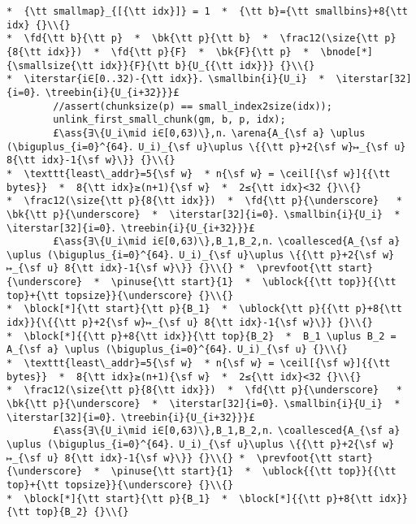 \documentclass[10pt,a4paper,twoside]{report}
\makeatletter
\newcommand{\ml}[2][t]{\mbox{\mdseries\begin{tabular}[#1]{@{}L@{}}#2\end{tabular}}}
\newcommand{\ass}[1]{\ensuremath{{\color{blue}\left\{\ml[c]{#1}\right\}}}}
\renewcommand{\ceil}[2][]{\left\lceil{#2}\right\rceil_{#1}}
\newcommand{\iterstar}[2][]{\text{\LARGE $*$}^{#1}_{#2}}
\makeatother
\begin{document}
\begin{lstlisting}
*  {\tt smallmap}_{[{\tt idx}]} = 1  *  {\tt b}={\tt smallbins}+8{\tt idx} {}\\{}
*  \fd{\tt b}{\tt p}  *  \bk{\tt p}{\tt b}  *  \frac12(\size{\tt p}{8{\tt idx}})  *  \fd{\tt p}{F}  *  \bk{F}{\tt p}  *  \bnode[*]{\smallsize{\tt idx}}{F}{\tt b}{U_{{\tt idx}}} {}\\{}
*  \iterstar{i∈[0..32)-{\tt idx}}．\smallbin{i}{U_i}  *  \iterstar[32]{i=0}．\treebin{i}{U_{i+32}}}£ 
        //assert(chunksize(p) == small_index2size(idx));
        unlink_first_small_chunk(gm, b, p, idx);
        £\ass{∃\{U_i\mid i∈[0,63)\},n．\arena{A_{\sf a} \uplus (\biguplus_{i=0}^{64}．U_i)_{\sf u}\uplus \{{\tt p}+2{\sf w}↦_{\sf u} 8{\tt idx}-1{\sf w}\}} {}\\{}
*  \texttt{least\_addr}=5{\sf w}  * n{\sf w} = \ceil[{\sf w}]{{\tt bytes}}  *  8{\tt idx}≥(n+1){\sf w}  *  2≤{\tt idx}<32 {}\\{}
*  \frac12(\size{\tt p}{8{\tt idx}})  *  \fd{\tt p}{\underscore}   *  \bk{\tt p}{\underscore}  *  \iterstar[32]{i=0}．\smallbin{i}{U_i}  *  \iterstar[32]{i=0}．\treebin{i}{U_{i+32}}}£ 
        £\ass{∃\{U_i\mid i∈[0,63)\},B_1,B_2,n．\coallesced{A_{\sf a} \uplus (\biguplus_{i=0}^{64}．U_i)_{\sf u}\uplus \{{\tt p}+2{\sf w}↦_{\sf u} 8{\tt idx}-1{\sf w}\}} {}\\{} *  \prevfoot{\tt start}{\underscore}  *  \pinuse{\tt start}{1}  *  \ublock{{\tt top}}{{\tt top}+{\tt topsize}}{\underscore} {}\\{}
*  \block[*]{\tt start}{\tt p}{B_1}  *  \ublock{\tt p}{{\tt p}+8{\tt idx}}{\{{\tt p}+2{\sf w}↦_{\sf u} 8{\tt idx}-1{\sf w}\}} {}\\{}
*  \block[*]{{\tt p}+8{\tt idx}}{\tt top}{B_2}  *  B_1 \uplus B_2 = A_{\sf a} \uplus (\biguplus_{i=0}^{64}．U_i)_{\sf u} {}\\{}
*  \texttt{least\_addr}=5{\sf w}  * n{\sf w} = \ceil[{\sf w}]{{\tt bytes}}  *  8{\tt idx}≥(n+1){\sf w}  *  2≤{\tt idx}<32 {}\\{}
*  \frac12(\size{\tt p}{8{\tt idx}})  *  \fd{\tt p}{\underscore}   *  \bk{\tt p}{\underscore}  *  \iterstar[32]{i=0}．\smallbin{i}{U_i}  *  \iterstar[32]{i=0}．\treebin{i}{U_{i+32}}}£ 
        £\ass{∃\{U_i\mid i∈[0,63)\},B_1,B_2,n．\coallesced{A_{\sf a} \uplus (\biguplus_{i=0}^{64}．U_i)_{\sf u}\uplus \{{\tt p}+2{\sf w}↦_{\sf u} 8{\tt idx}-1{\sf w}\}} {}\\{} *  \prevfoot{\tt start}{\underscore}  *  \pinuse{\tt start}{1}  *  \ublock{{\tt top}}{{\tt top}+{\tt topsize}}{\underscore} {}\\{}
*  \block[*]{\tt start}{\tt p}{B_1}  *  \block[*]{{\tt p}+8{\tt idx}}{\tt top}{B_2} {}\\{}

\end{lstlisting}
\end{document}
